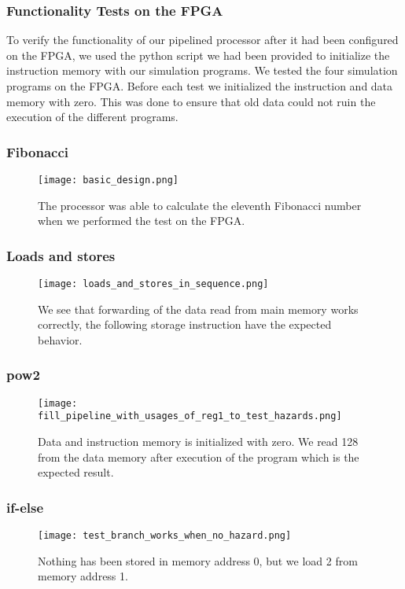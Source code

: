 \documentclass[11pt]{article}
\begin{document}
\subsubsection{Functionality Tests on the FPGA}
\label{subsec:funcfpga} 
To verify the functionality of our pipelined processor after it had
been configured on the FPGA, we used the python script we had been
provided to initialize the instruction memory with our simulation
programs. We tested the four simulation programs on the FPGA.  Before
each test we initialized the instruction and data memory with
zero. This was done to ensure that old data could not ruin the
execution of the different programs.

\subsubsection*{Fibonacci}
\begin{figure}[!h]
\texttt{[image: basic\_design.png]}
\caption{The processor was able to calculate the eleventh Fibonacci number when we performed the test on the FPGA.}
\label{fig:register_write}
\end{figure}

\subsubsection*{Loads and stores}
\begin{figure}[!h]
\texttt{[image: loads\_and\_stores\_in\_sequence.png]}
\caption{We see that forwarding of the data read from main memory works correctly, the following storage instruction have the expected behavior.}
\label{fig:register_write}
\end{figure}

\subsubsection*{pow2}
\begin{figure}[!h]
\texttt{[image: fill\_pipeline\_with\_usages\_of\_reg1\_to\_test\_hazards.png]}
\caption{Data and instruction memory is initialized with zero. We read 128 from the data memory after execution of the program which is the expected result.}
\label{fig:register_write}
\end{figure}

\subsubsection*{if-else}
\begin{figure}[!h]
\texttt{[image: test\_branch\_works\_when\_no\_hazard.png]}
\caption{Nothing has been stored in memory address 0, but we load 2 from memory address 1.}
\label{fig:register_write}
\end{figure}
\end{document}
